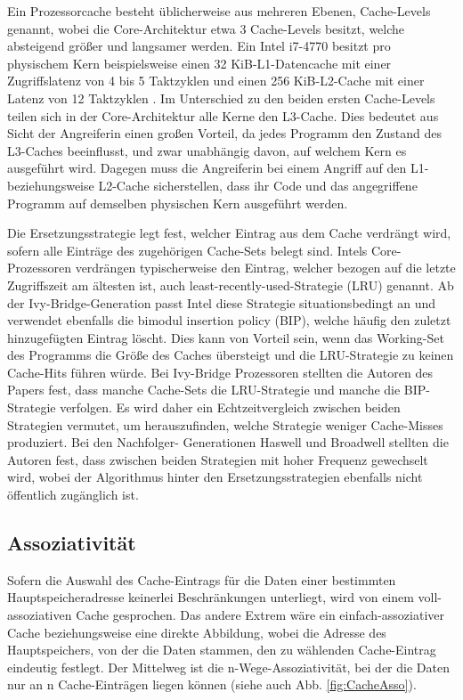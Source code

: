 Ein Prozessorcache besteht üblicherweise aus mehreren Ebenen, Cache-Levels genannt, wobei die Core-Architektur etwa 3 Cache-Levels besitzt, welche absteigend größer und langsamer werden. Ein Intel i7-4770 besitzt pro physischem Kern beispielsweise einen 32 KiB-L1-Datencache mit einer Zugriffslatenz von 4 bis 5 Taktzyklen und einen 256 KiB-L2-Cache mit einer Latenz von 12 Taktzyklen \cite{CacheStatsHaswell}.
Im Unterschied zu den beiden ersten Cache-Levels teilen sich in der Core-Architektur alle Kerne den L3-Cache. 
Dies bedeutet aus Sicht der Angreiferin einen großen Vorteil, da jedes Programm den Zustand des L3-Caches beeinflusst, und zwar unabhängig davon, auf welchem Kern es ausgeführt wird.
Dagegen muss die Angreiferin bei einem Angriff auf den L1- beziehungsweise L2-Cache sicherstellen, dass ihr Code und das angegriffene Programm auf demselben physischen Kern ausgeführt werden.

Die Ersetzungsstrategie legt fest, welcher Eintrag aus dem Cache verdrängt wird, sofern alle Einträge des zugehörigen Cache-Sets belegt sind. 
Intels Core-Prozessoren verdrängen typischerweise den Eintrag, welcher bezogen auf die letzte Zugriffszeit am ältesten ist, auch least-recently-used-Strategie (LRU) genannt. 
Ab der Ivy-Bridge-Generation passt Intel diese Strategie situationsbedingt an \cite{CacheReplacementPolicy} und verwendet ebenfalls  die bimodul insertion policy (BIP), welche häufig den zuletzt hinzugefügten Eintrag löscht. 
Dies kann von Vorteil sein, wenn das Working-Set des Programms die Größe des Caches übersteigt und die LRU-Strategie zu keinen Cache-Hits führen würde.
Bei Ivy-Bridge Prozessoren stellten die Autoren des Papers fest, dass manche Cache-Sets die LRU-Strategie und manche die BIP-Strategie verfolgen. 
Es wird daher ein Echtzeitvergleich zwischen beiden Strategien vermutet, um herauszufinden, welche Strategie weniger Cache-Misses produziert. 
Bei den Nachfolger- Generationen Haswell und Broadwell stellten die Autoren fest, dass zwischen beiden Strategien mit hoher Frequenz gewechselt wird, wobei der Algorithmus hinter den Ersetzungsstrategien ebenfalls nicht öffentlich zugänglich ist.

\subsection{Assoziativität}


Sofern die Auswahl des Cache-Eintrags für die Daten einer bestimmten Hauptspeicheradresse keinerlei Beschränkungen unterliegt, wird von einem voll-assoziativen Cache gesprochen. 
Das andere Extrem wäre ein einfach-assoziativer Cache beziehungsweise eine direkte Abbildung, wobei die Adresse des Hauptspeichers, von der die Daten stammen, den zu wählenden Cache-Eintrag eindeutig festlegt.
Der Mittelweg ist die n-Wege-Assoziativität, bei der die Daten nur an n Cache-Einträgen liegen können (siehe auch Abb. \ref{fig:CacheAsso}).

